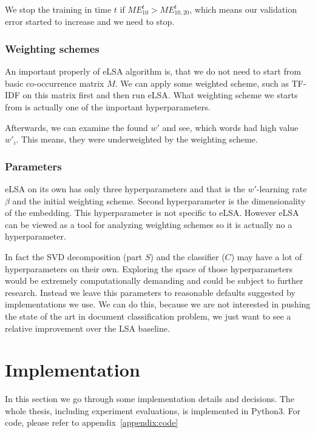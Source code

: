     We stop the training in time $t$ if $ME_{10}^t > ME_{10,20}^t$, which means our validation error started to increase and we need to stop.
    
    \subsubsection{Weighting schemes}
    
    An important properly of eLSA algorithm is, that we do not need to start from basic co-occurrence matrix $M$. 
    We can apply some weighted scheme, such as TF-IDF on this matrix first and then run eLSA.
    What weighting scheme we starts from is actually one of the important hyperparameters.
    
    Afterwards, we can examine the found $w'$ and see, which words had high value $w'_i$.
    This means, they were underweighted by the weighting scheme.

    \subsubsection{Parameters} \label{sec:hyperparams}
    
    eLSA on its own has only three hyperparameters and that is the $w'$-learning rate $\beta$ and the initial weighting scheme. 
    Second hyperparameter is the dimensionality of the embedding. 
    This hyperparameter is not specific to eLSA.
    However eLSA can be viewed as a tool for analyzing weighting schemes so it is actually no a hyperparameter.
    
    In fact the SVD decomposition (part $S$) and the classifier ($C$) may have a lot of hyperparameters on their own.
    Exploring the space of those hyperparameters would be extremely computationally demanding and could be subject to further research.
    Instead we leave this parameters to reasonable defaults suggested by implementations we use.
    We can do this, because we are not interested in pushing the state of the art in document classification problem, we just want to see a relative improvement over the LSA baseline.


\section{Implementation}
    
    In this section we go through some implementation details and decisions.
    The whole thesis, including experiment evaluations, is implemented in Python3.
    For code, please refer to appendix~\ref{appendix:code}

